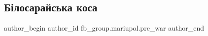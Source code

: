  
 
 
 
 

\subsection{Білосарайська коса}
\label{sec:12_02_2023.fb.fb_group.mariupol.pre_war.9.b_losaraiska_kosa}

\ifcmt
 author_begin
   author_id fb_group.mariupol.pre_war
 author_end
\fi
